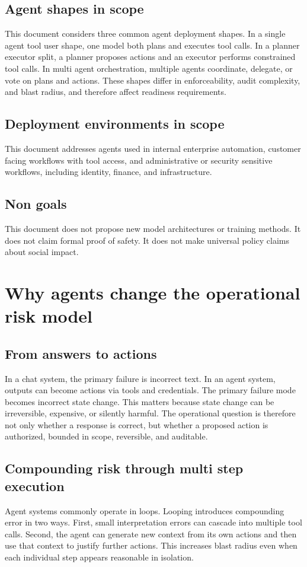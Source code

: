\documentclass[11pt]{article}
\begin{document}
\subsection{Agent shapes in scope}
This document considers three common agent deployment shapes. In a single agent tool user shape, one model both plans and executes tool calls. In a planner executor split, a planner proposes actions and an executor performs constrained tool calls. In multi agent orchestration, multiple agents coordinate, delegate, or vote on plans and actions. These shapes differ in enforceability, audit complexity, and blast radius, and therefore affect readiness requirements.

\subsection{Deployment environments in scope}
This document addresses agents used in internal enterprise automation, customer facing workflows with tool access, and administrative or security sensitive workflows, including identity, finance, and infrastructure.

\subsection{Non goals}
This document does not propose new model architectures or training methods. It does not claim formal proof of safety. It does not make universal policy claims about social impact.

\section{Why agents change the operational risk model}

\subsection{From answers to actions}
In a chat system, the primary failure is incorrect text. In an agent system, outputs can become actions via tools and credentials. The primary failure mode becomes incorrect state change. This matters because state change can be irreversible, expensive, or silently harmful. The operational question is therefore not only whether a response is correct, but whether a proposed action is authorized, bounded in scope, reversible, and auditable.

\subsection{Compounding risk through multi step execution}
Agent systems commonly operate in loops. Looping introduces compounding error in two ways. First, small interpretation errors can cascade into multiple tool calls. Second, the agent can generate new context from its own actions and then use that context to justify further actions. This increases blast radius even when each individual step appears reasonable in isolation.
\end{document}
